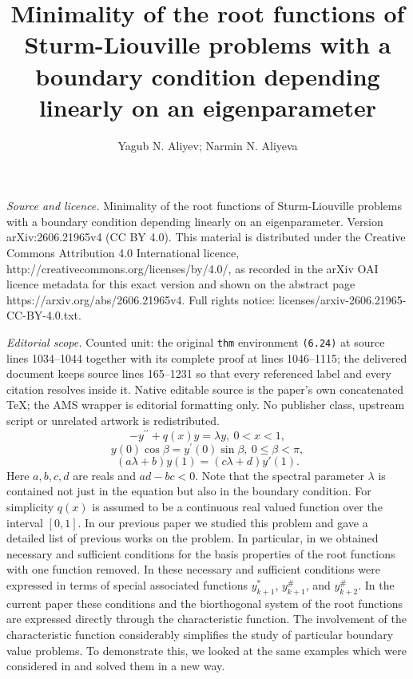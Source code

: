 \documentclass[10pt,a4paper]{amsart}
\numberwithin{equation}{section}
\begin{document}
\title[Minimality of the root functions of Sturm-Liouville problems]{Minimality of the root functions of Sturm-Liouville problems with a boundary condition depending linearly on an eigenparameter}
\author{Yagub N. Aliyev; Narmin N. Aliyeva}
\date{}
\maketitle
\noindent\emph{Source and licence.} Minimality of the root functions of Sturm-Liouville problems with a boundary condition depending linearly on an eigenparameter. Version arXiv:2606.21965v4 (CC BY 4.0). This material is distributed under the Creative Commons Attribution 4.0 International licence, http://creativecommons.org/licenses/by/4.0/, as recorded in the arXiv OAI licence metadata for this exact version and shown on the abstract page https://arxiv.org/abs/2606.21965v4. Full rights notice: licenses/arxiv-2606.21965-CC-BY-4.0.txt.\par\smallskip
\noindent\textit{Editorial scope.} Counted unit: the original \texttt{thm} environment \texttt{(6.24)} at source lines 1034--1044 together with its complete proof at lines 1046--1115; the delivered document keeps source lines 165--1231 so that every referenced label and every citation resolves inside it. Native editable source is the paper's own concatenated TeX; the AMS wrapper is editorial formatting only. No publisher class, upstream script or unrelated artwork is redistributed.
\begin{equation}
  -y^{\prime \prime }+q(x)y=\lambda y,\ 0<x<1,  \label{(1.1)} 
\end{equation}
\begin{equation}
y(0)\cos \beta =y^{\prime }(0)\sin \beta ,\ 0\leq \beta <\pi ,
\label{(1.2)}
\end{equation}
\begin{equation}
(a\lambda + b)y(1) = (c\lambda + d)y{'}(1). \label{(1.3)}
\end{equation}
Here $a,b,c,d$ are reals and $ad-bc<0$. Note that the spectral parameter $\lambda $ is contained not just in the equation but also in the boundary condition. For simplicity $q(x)$ is assumed to be a continuous real valued function over the interval $[0,1]$. In our previous paper \cite{aliyev5} we studied this problem and gave a detailed list of previous works on the problem. In particular, in \cite{aliyev5} we obtained necessary and sufficient conditions for the basis properties of the root functions with one function removed. In \cite{aliyev5} these necessary and sufficient conditions were expressed in terms of special associated functions $y_{k+1}^*$, $y_{k+1}^\#$, and $y_{k+2}^\#$. In the current paper these conditions and the biorthogonal system of the root functions  are expressed directly through the characteristic function. The involvement of the characteristic function considerably simplifies the study of particular boundary value problems. To demonstrate this, we looked at the same examples which were considered in \cite{aliyev5} and solved them in a new way.
\end{document}
